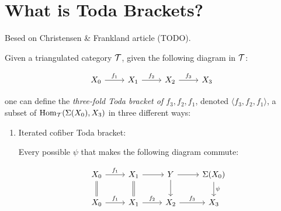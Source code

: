 \section{What is Toda Brackets?}

Besed on Christensen \& Frankland article (TODO).

\begin{definition}
    Given a triangulated category \( \mathcal{T} \), given the following diagram in \( \mathcal{T} \):

    \[\begin{tikzcd}
        {X_0} & {X_1} & {X_2} & {X_3}
        \arrow["{f_1}", from=1-1, to=1-2]
        \arrow["{f_2}", from=1-2, to=1-3]
        \arrow["{f_3}", from=1-3, to=1-4]
    \end{tikzcd}\]

    one can define the \emph{three-fold Toda bracket of \( f_3, f_2, f_1 \)}, denoted \( \langle f_3, f_2, f_1 \rangle \), a subset of \( \operatorname{Hom}_{\mathcal{T}}(\Sigma(X_0), X_3) \) in three different ways:

    \begin{enumerate}
        \item {
            Iterated cofiber Toda bracket:

            Every possible \( \psi \) that makes the following diagram commute:

            \[\begin{tikzcd}
                {X_0} & {X_1} & {Y} & {\Sigma(X_0)} \\
                {X_0} & {X_1} & {X_2} & {X_3}
                \arrow["{f_1}", from=1-1, to=1-2]
                \arrow[from=1-2, to=1-3]
                \arrow[from=1-3, to=1-4]
                \arrow[Rightarrow, no head, from=1-1, to=2-1]
                \arrow[Rightarrow, no head, from=1-2, to=2-2]
                \arrow[from=1-3, to=2-3]
                \arrow["\psi", from=1-4, to=2-4]
                \arrow["{f_1}", from=2-1, to=2-2]
                \arrow["{f_2}", from=2-2, to=2-3]
                \arrow["{f_3}", from=2-3, to=2-4]
            \end{tikzcd}\]

}
\end{enumerate}
\end{definition}
